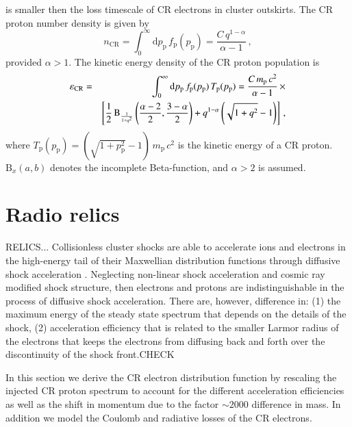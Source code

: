 \documentclass[useAMS,usenatbib]{mn2e}
\newcommand{\dd}{\mathrm{d}}
\newcommand{\eps}{\varepsilon}
\newcommand{\p}{\mathrm{p}}
\newcommand{\CR}{\mathrm{CR}}
\newcommand{\B}{\mathrm{B}}
\begin{document}
is smaller then the loss timescale of CR electrons in cluster
outskirts. The CR proton number density is given by
\begin{equation}
  \label{eq:ncr}
  n_{\CR} = \int_0^\infty \dd p_\p\, f_\p(p_\p) =
  \frac{C\, q^{1-\alpha}}{\alpha-1}\,,
\end{equation}
provided $\alpha >1$. The kinetic energy density of the CR
proton population is
\begin{eqnarray}
  \label{eq:epscr}
  \eps_\CR &=& \int_0^\infty  \dd p_\p\, f_\p(p_\p) \,T_{\rmn
    p}(p_\p)=\frac{C\, m_\p\,c^2}{\alpha-1} \, \times
  \nonumber \\
  && \left[\frac{1}{2}
    \, \B_{\frac{1}{1+q^2}} \left(
    \frac{\alpha-2}{2},\frac{3-\alpha}{2}\right) + q^{1-\alpha}
    \left(\sqrt{1+q^2}-1 \right) \right] \,,
\end{eqnarray}
where $T_\p(p_\p) = (\sqrt{1+p_\p^2} -1)\, m_\p\,c^2$ is the kinetic energy
of a CR proton. $\B_x(a,b)$ denotes the incomplete Beta-function, and
$\alpha>2$ is assumed. 


\section{Radio relics}
\label{section:relics}
RELICS...  Collisionless cluster shocks are able to accelerate ions
and electrons in the high-energy tail of their Maxwellian distribution
functions through diffusive shock acceleration \citep[for reviews
  see][]{1983RPPh...46..973D, 1987PhR...154....1B,
  2001RPPh...64..429M}. Neglecting non-linear shock acceleration and
cosmic ray modified shock structure, then electrons and protons are
indistinguishable in the process of diffusive shock
acceleration. There are, however, difference in: (1) the maximum
energy of the steady state spectrum that depends on the details of the
shock, (2) acceleration efficiency that is related to the smaller
Larmor radius of the electrons that keeps the electrons from diffusing
back and forth over the discontinuity of the shock front.CHECK

In this section we derive the CR electron distribution function by
rescaling the injected CR proton spectrum to account for the different
acceleration efficiencies as well as the shift in momentum due to the
factor $\sim 2000$ difference in mass. In addition we model the
Coulomb and radiative losses of the CR electrons.
\end{document}
